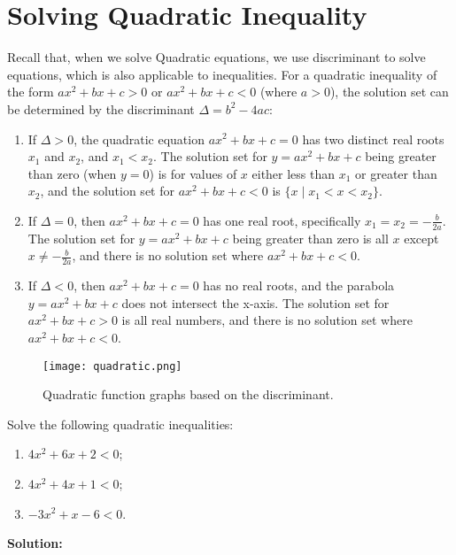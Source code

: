 \section{Solving Quadratic Inequality}
Recall that, when we solve Quadratic equations, we use discriminant to solve equations, which is also applicable to inequalities.
For a quadratic inequality of the form $ax^2 + bx + c > 0$ or $ax^2 + bx + c < 0$ (where $a > 0$), the solution set can be determined by the discriminant $\Delta = b^2 - 4ac$:
\begin{enumerate}
    \item If $\Delta > 0$, the quadratic equation $ax^2 + bx + c = 0$ has two distinct real roots $x_1$ and $x_2$, and $x_1 < x_2$. The solution set for $y = ax^2 + bx + c$ being greater than zero (when $y = 0$) is for values of $x$ either less than $x_1$ or greater than $x_2$, and the solution set for $ax^2 + bx + c < 0$ is $\{ x \mid x_1 < x < x_2 \}$.
    \item If $\Delta = 0$, then $ax^2 + bx + c = 0$ has one real root, specifically $x_1 = x_2 = -\frac{b}{2a}$. The solution set for $y = ax^2 + bx + c$ being greater than zero is all $x$ except $x \neq -\frac{b}{2a}$, and there is no solution set where $ax^2 + bx + c < 0$.
    \item If $\Delta < 0$, then $ax^2 + bx + c = 0$ has no real roots, and the parabola $y = ax^2 + bx + c$ does not intersect the x-axis. The solution set for $ax^2 + bx + c > 0$ is all real numbers, and there is no solution set where $ax^2 + bx + c < 0$.
\end{enumerate}
\begin{figure}[ht!]
    \centering
    \texttt{[image: quadratic.png]}
    \caption{Quadratic function graphs based on the discriminant.}
\end{figure}
\begin{example}
    Solve the following quadratic inequalities:

\begin{enumerate}
    \item \(4x^2 + 6x + 2 < 0\);
    \item \(4x^2 + 4x + 1 < 0\);
    \item \(-3x^2 + x - 6 < 0\).
\end{enumerate}
\end{example}
\textbf{Solution:}

